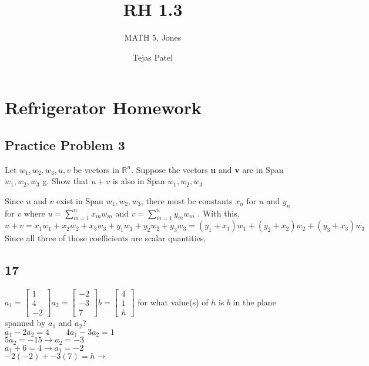 \documentclass{article}
\title{RH 1.3}
\author{MATH 5, Jones}
\date{Tejas Patel}
\begin{document}
\maketitle
\section{Refrigerator Homework}
\subsection*{Practice Problem 3}
Let \textbf{$w_1, w_2, w_3, u, v$} be vectors in $\mathbb{R}^n$. Suppose the vectors \textbf{u} and \textbf{v} are in Span ${w_1, w_2, w_3}$
g. Show that $u + v$ is also in Span ${w_1, w_2, w_3}$

Since $u$ and $v$ exist in Span ${w_1, w_2, w_3}$, there must bc constants $x_n$ for $u$ and $y_n$ for $v$ where $u= \sum_{m=1}^{n} x_mw_m$ and $v= \sum_{m=1}^{n} y_mw_m$
. With this, $u+v=x_1w_1+x_2w_2+x_3w_3+y_1w_1+y_2w_2+y_3w_3= (y_1+x_1)w_1+(y_2+x_2)w_2+(y_3+x_3)w_3$
\\Since all three of those coefficients are scalar quantities, 
\subsection*{17}
$a_1=\left[\begin{array}{c}
    1\\4\\-2
\end{array}\right]a_2=\left[\begin{array}{c}
-2\\-3\\7
\end{array}\right]b=\left[\begin{array}{c}
4\\1\\h
\end{array}\right]$ for what value(s) of $h$ is $b$ in the plane spanned by $a_1$ and $a_2$?
\\[0.1in]$a_1-2a_2=4 \qquad 4a_1-3a_2=1$\\$5a_2=-15 \rightarrow a_2=-3$\\$a_1+6=4 \rightarrow a_1=-2$\\$-2(-2)+-3(7)=h \rightarrow$ 
\end{document}
